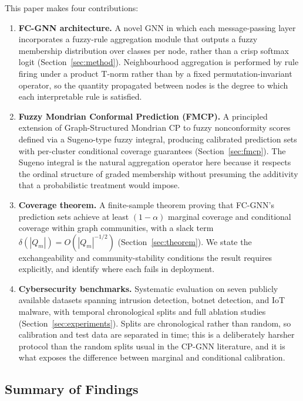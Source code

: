 This paper makes four contributions:

\begin{enumerate}
\item \textbf{FC-GNN architecture.}  A novel GNN in which each
  message-passing layer incorporates a fuzzy-rule aggregation module that
  outputs a fuzzy membership distribution over classes per node, rather than
  a crisp softmax logit (Section~\ref{sec:method}).
  Neighbourhood aggregation is performed by rule firing under a product T-norm
  rather than by a fixed permutation-invariant operator, so the quantity
  propagated between nodes is the degree to which each interpretable rule is
  satisfied.

\item \textbf{Fuzzy Mondrian Conformal Prediction (FMCP).}  A principled
  extension of Graph-Structured Mondrian CP \citep{rrgnn} to fuzzy
  nonconformity scores defined via a Sugeno-type fuzzy integral, producing
  calibrated prediction sets with per-cluster conditional coverage guarantees
  (Section~\ref{sec:fmcp}).
  The Sugeno integral is the natural aggregation operator here because it
  respects the ordinal structure of graded membership without presuming the
  additivity that a probabilistic treatment would impose.

\item \textbf{Coverage theorem.}  A finite-sample theorem proving that FC-GNN's
  prediction sets achieve at least $(1-\alpha)$ marginal coverage and
  conditional coverage within graph communities, with a slack term
  $\delta(|Q_m|) = O(|Q_m|^{-1/2})$ (Section~\ref{sec:theorem}).
  We state the exchangeability and community-stability conditions the result
  requires explicitly, and identify where each fails in deployment.

\item \textbf{Cybersecurity benchmarks.}  Systematic evaluation on seven
  publicly available datasets spanning intrusion detection, botnet detection,
  and IoT malware, with temporal chronological splits and full ablation
  studies (Section~\ref{sec:experiments}).
  Splits are chronological rather than random, so calibration and test data are
  separated in time; this is a deliberately harsher protocol than the random
  splits usual in the CP-GNN literature, and it is what exposes the difference
  between marginal and conditional calibration.
\end{enumerate}

\subsection{Summary of Findings}

